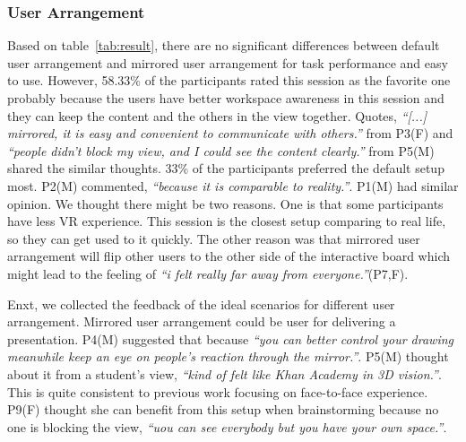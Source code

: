 \documentclass{sigchi}
\begin{document}
\subsubsection{User Arrangement}
Based on table~\ref{tab:result}, there are no significant differences between default user arrangement and mirrored user arrangement for task performance and easy to use. However, 58.33\% of the participants rated this session as the favorite one probably because the users have better workspace awareness in this session and they can keep the content and the others in the view together. Quotes, \textit{``[...] mirrored, it is easy and convenient to communicate with others.''} from P3(F) and \textit{``people didn't block my view, and I could see the content clearly.''} from P5(M) shared the similar thoughts. 33\% of the participants preferred the default setup most. P2(M) commented, \textit{``because it is comparable to reality.''}. P1(M) had similar opinion. We thought there might be two reasons. One is that some participants have less VR experience. This session is the closest setup comparing to real life, so they can get used to it quickly. The other reason was that mirrored user arrangement will flip other users to the other side of the interactive board which might lead to the feeling of \textit{``i felt really far away from everyone.''}(P7,F).

Enxt, we collected the feedback of the ideal scenarios for different user arrangement. Mirrored user arrangement could be user for delivering a presentation. P4(M) suggested that because \textit{``you can better control your drawing meanwhile keep an eye on people's reaction through the mirror.''}. P5(M) thought about it from a student's view, \textit{``kind of felt like Khan Academy in 3D vision.''}. This is quite consistent to previous work focusing on face-to-face experience. P9(F) thought she can benefit from this setup when brainstorming because no one is blocking the view, \textit{``uou can see everybody but you have your own space.''}.
\end{document}
